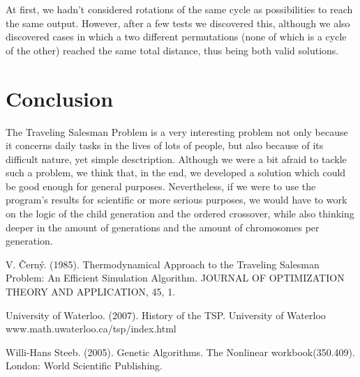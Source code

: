 \documentclass[twoside,twocolumn]{article}
\begin{document}
At first, we hadn't considered rotations of the same cycle as possibilities to reach the same output. However, after a few tests we discovered this, although we also discovered cases in which a two different permutations (none of which is a cycle of the other) reached the same total distance, thus being both valid solutions.
  
\section{Conclusion}
  
The Traveling Salesman Problem is a very interesting problem not only because it concerns daily tasks in the lives of lots of people, but also because of its difficult nature, yet simple desctription. Although we were a bit afraid to tackle such a problem, we think that, in the end, we developed a solution which could be good enough for general purposes. Nevertheless, if we were to use the program's results for scientific or more serious purposes, we would have to work on the logic of the child generation and the ordered crossover, while also thinking deeper in the amount of generations and the amount of chromosomes per generation.
  
  
  \begin{thebibliography}{99} %
  
  
  V. Černý. (1985). 
  \newblock Thermodynamical Approach to the Traveling Salesman Problem: An Efficient Simulation Algorithm. 
  \newblock JOURNAL OF OPTIMIZATION THEORY AND APPLICATION, 45, 1.
  
  University of Waterloo. (2007). 
  \newblock History of the TSP. University of Waterloo
  \newblock www.math.uwaterloo.ca/tsp/index.html
  
  Willi-Hans Steeb. (2005). 
  \newblock Genetic Algorithms. 
  \newblock The Nonlinear workbook(350.409). London: World Scientific Publishing.
  
  \end{thebibliography}
  
  
  
\end{document}
